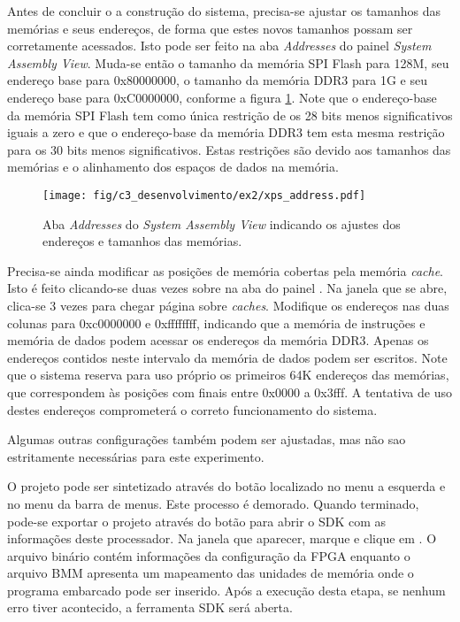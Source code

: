 \documentclass[11pt,a4paper,oneside]{book}
\begin{document}
Antes de concluir o a construção do sistema, precisa-se ajustar os tamanhos das memórias e seus endereços, de forma que estes novos tamanhos possam ser corretamente acessados.
Isto pode ser feito na aba \textit{Addresses} do painel \textit{System Assembly View}.
Muda-se então o tamanho da memória SPI Flash para 128M, seu endereço base para 0x80000000, o tamanho da memória DDR3 para 1G e seu endereço base para 0xC0000000, conforme a figura \ref{fig:ex2:xps_enderecos}.
Note que o endereço-base da memória SPI Flash tem como única restrição de os 28 bits menos significativos iguais a zero e que o endereço-base da memória DDR3 tem esta mesma restrição para os 30 bits menos significativos.
Estas restrições são devido aos tamanhos das memórias e o alinhamento dos espaços de dados na memória.

\begin{figure}[htp]
\centering
\texttt{[image: fig/c3\_desenvolvimento/ex2/xps\_address.pdf]}
\caption{Aba \textit{Addresses} do \textit{System Assembly View} indicando os ajustes dos endereços e tamanhos das memórias.}
\label{fig:ex2:xps_enderecos}
\end{figure}

Precisa-se ainda modificar as posições de memória cobertas pela memória \textit{cache}.
Isto é feito clicando-se duas vezes sobre  na aba  do painel .
Na janela que se abre, clica-se   3 vezes para chegar página sobre \textit{caches}.
Modifique os endereços nas duas colunas para 0xc0000000 e 0xffffffff, indicando que a memória de instruções e memória de dados podem acessar os endereços da memória DDR3.
Apenas os endereços contidos neste intervalo da memória de dados podem ser escritos.
Note que o sistema reserva para uso próprio os primeiros 64K endereços das memórias, que correspondem às posições com finais entre 0x0000 a 0x3fff.
A tentativa de uso destes endereços comprometerá o correto funcionamento do sistema.

Algumas outras configurações também podem ser ajustadas, mas não sao estritamente necessárias para este experimento.

O projeto pode ser sintetizado através do botão  localizado no menu a esquerda e no menu  da barra de menus.
Este processo é demorado.
Quando terminado, pode-se exportar o projeto através do botão  para abrir o SDK com as informações deste processador.
Na janela que aparecer, marque  e clique em .
O arquivo binário contém informações da configuração da FPGA enquanto o arquivo BMM apresenta um mapeamento das unidades de memória onde o programa embarcado pode ser inserido.
Após a execução desta etapa, se nenhum erro tiver acontecido, a ferramenta SDK será aberta.
\end{document}

